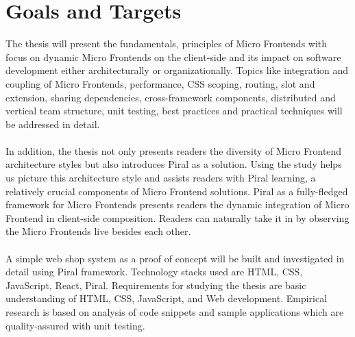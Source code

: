 \documentclass[a4paper]{book}
\begin{document}
\section{Goals and Targets}
The thesis will present the fundamentals,  principles of Micro Frontends with focus on dynamic Micro Frontends on the client-side and its impact on software development either architecturally or organizationally. Topics like integration and coupling of Micro Frontends, performance, CSS scoping, routing, slot and extension, sharing dependencies, cross-framework components, distributed and vertical team structure, unit testing, best practices and practical techniques will be addressed in detail. 
\\
\\
In addition, the thesis not only presents readers the diversity of Micro Frontend architecture styles but also introduces Piral as a solution. Using the study helps us picture this architecture style and assists readers with Piral learning, a relatively crucial components of Micro Frontend solutions. Piral as a fully-fledged framework for Micro Frontends presents readers the dynamic integration of Micro Frontend in client-side composition. Readers can naturally take it in by observing the Micro Frontends live besides each other.
\\
\\
A simple web shop system as a proof of concept will be built and investigated in detail using Piral framework. Technology stacks used are HTML, CSS, JavaScript, React, Piral. Requirements for studying the thesis are basic understanding of HTML, CSS, JavaScript, and Web development. Empirical research is based on analysis of code snippets and sample applications which are quality-assured with unit testing.
\end{document}
